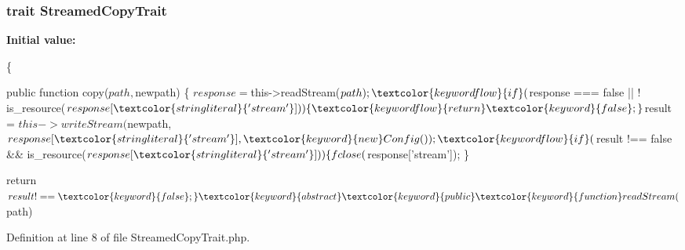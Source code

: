 \subsubsection[{Streamed\+Copy\+Trait}]{\setlength{\rightskip}{0pt plus 5cm}trait Streamed\+Copy\+Trait}\label{namespace_league_1_1_flysystem_1_1_adapter_1_1_polyfill_adf1cdf3c1cc690735d5de9cc9d2d60de}
{\bfseries Initial value\+:}
\begin{DoxyCode}
\{
    
    \textcolor{keyword}{public} \textcolor{keyword}{function} copy($path, $newpath)
    \{
        $response = $this->readStream($path);

        \textcolor{keywordflow}{if} ($response === \textcolor{keyword}{false} || ! is\_resource($response[\textcolor{stringliteral}{'stream'}])) \{
            \textcolor{keywordflow}{return} \textcolor{keyword}{false};
        \}

        $result = $this->writeStream($newpath, $response[\textcolor{stringliteral}{'stream'}], \textcolor{keyword}{new} Config());

        \textcolor{keywordflow}{if} ($result !== \textcolor{keyword}{false} && is\_resource($response[\textcolor{stringliteral}{'stream'}])) \{
            fclose($response[\textcolor{stringliteral}{'stream'}]);
        \}

        \textcolor{keywordflow}{return} $result !== \textcolor{keyword}{false};
    \}

    

    
    \textcolor{keyword}{abstract} \textcolor{keyword}{public} \textcolor{keyword}{function} readStream($path)
\end{DoxyCode}


Definition at line 8 of file Streamed\+Copy\+Trait.\+php.

